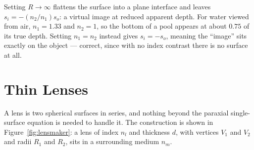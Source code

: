 \begin{example}
Setting $R \to \infty$ flattens the surface into a plane interface and leaves $s_i = -(n_2/n_1)s_o$: a virtual image at reduced apparent depth. For water viewed from air, $n_1 = 1.33$ and $n_2 = 1$, so the bottom of a pool appears at about $0.75$ of its true depth. Setting $n_1 = n_2$ instead gives $s_i = -s_o$, meaning the ``image'' sits exactly on the object --- correct, since with no index contrast there is no surface at all.
\end{example}

\section{Thin Lenses}

A lens is two spherical surfaces in series, and nothing beyond the paraxial single-surface equation is needed to handle it. The construction is shown in Figure~\ref{fig:lensmaker}: a lens of index $n_l$ and thickness $d$, with vertices $V_1$ and $V_2$ and radii $R_1$ and $R_2$, sits in a surrounding medium $n_m$.

